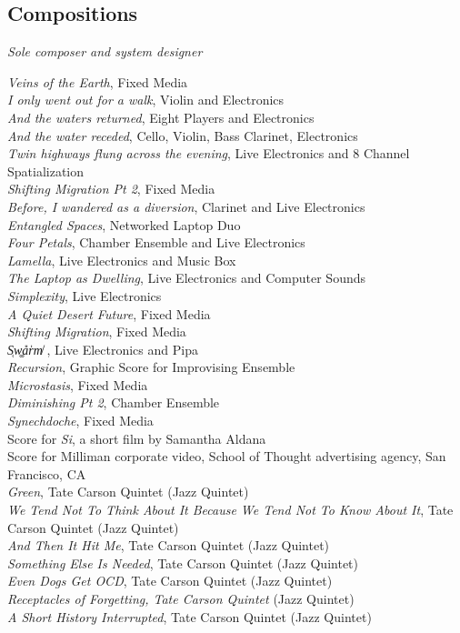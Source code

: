 \documentclass[12pt, a4paper]{article}
\newcommand{\years}[1]{\leavevmode\marginnote{\scriptsize #1}\ignorespaces}%
\newcommand{\sectionnote}[1]{%
  {\small\emph{#1}}\par\vspace{0.5em}
}
\begin{document}
\subsection*{Compositions}
\sectionnote{Sole composer and system designer}
\years{2024} 
\textit{Veins of the Earth}, Fixed Media\\ 
\years{2017}
\textit{I only went out for a walk}, Violin and Electronics\\
\textit{And the waters returned}, Eight Players and Electronics \\
\textit{And the water receded}, Cello, Violin, Bass Clarinet, Electronics \\
\years{2016} 
\textit{Twin highways flung across the evening}, Live Electronics and 8 Channel Spatialization \\
\textit{Shifting Migration Pt 2}, Fixed Media \\
\textit{Before, I wandered as a diversion}, Clarinet and Live Electronics\\
\textit{Entangled Spaces}, Networked Laptop Duo \\
\textit{Four Petals}, Chamber Ensemble and Live Electronics\\
\textit{Lamella}, Live Electronics and Music Box\\
\textit{The Laptop as Dwelling}, Live Electronics and Computer Sounds\\
\textit{Simplexity}, Live Electronics \\
\textit{A Quiet Desert Future}, Fixed Media\\
\textit{Shifting Migration}, Fixed Media \\
\years{2015}
\textit{S̜w͚a̎r̍m̸}  , Live Electronics and Pipa\\  
\textit{Recursion}, Graphic Score for Improvising Ensemble \\  
\textit{Microstasis}, Fixed Media\\  
\textit{Diminishing Pt 2}, Chamber Ensemble \\  
\textit{Synechdoche}, Fixed Media \\  
Score for \textit{Si}, a short film by Samantha Aldana\\
Score for Milliman corporate video, School of Thought advertising agency, San Francisco, CA\\  
\years{2012} 
\textit{Green}, Tate Carson Quintet (Jazz Quintet)\\
\textit{We Tend Not To Think About It Because We Tend Not To Know About It}, Tate Carson Quintet (Jazz Quintet)\\
\textit{And Then It Hit Me}, Tate Carson Quintet (Jazz Quintet)\\
\textit{Something Else Is Needed}, Tate Carson Quintet (Jazz Quintet)\\
\textit{Even Dogs Get OCD}, Tate Carson Quintet (Jazz Quintet)\\
\textit{Receptacles of Forgetting, Tate Carson Quintet} (Jazz Quintet)\\
\textit{A Short History Interrupted}, Tate Carson Quintet (Jazz Quintet)
\end{document}
